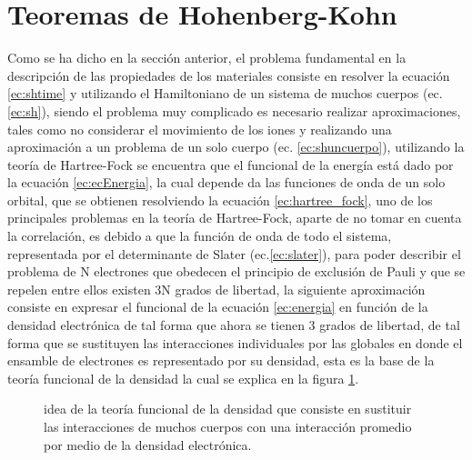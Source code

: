 \documentclass[12pt,a4paper, oneside]{book}
\begin{document}
  \section{Teoremas de Hohenberg-Kohn} \label{sec:Ho-Ko}
  Como se ha dicho en la secci\'on anterior, el problema fundamental en la descripci\'on de  las propiedades de los materiales consiste en resolver la ecuaci\'on \ref{ec:shtime} y utilizando el Hamiltoniano de un sistema de muchos cuerpos (ec. \ref{ec:sh}), siendo el problema muy complicado es necesario realizar aproximaciones, tales como no considerar el movimiento de los iones y realizando una aproximaci\'on a un problema de un solo cuerpo (ec. \ref{ec:shuncuerpo}), utilizando la teor\'ia de Hartree-Fock se encuentra que el funcional de la energ\'ia est\'a dado por la ecuaci\'on \ref{ec:ecEnergia}, la cual depende da las funciones de onda de un solo orbital, que se obtienen resolviendo la ecuaci\'on \ref{ec:hartree_fock}, uno de los principales problemas en la teor\'ia de Hartree-Fock, aparte de no tomar en cuenta la correlaci\'on, es debido a que la funci\'on de onda de todo el sistema, representada por el determinante de Slater (ec.\ref{ec:slater}), para poder describir el problema de N electrones que obedecen el principio de exclusi\'on de Pauli y que se repelen entre ellos existen 3N grados de libertad, la siguiente aproximaci\'on consiste en expresar el funcional de la ecuaci\'on \ref{ec:energia} en funci\'on de la densidad electr\'onica de tal forma que ahora se tienen 3 grados de libertad, de tal forma que se sustituyen las interacciones individuales por las globales en donde el ensamble de electrones es representado por su densidad, esta es la base de la teor\'ia funcional de la densidad la cual se explica en la figura \ref{im:dftIdea}.
  \begin{figure}[!hbt]
  	\centering
  	\caption{idea de la teor\'ia funcional de la densidad que consiste en sustituir las interacciones de muchos cuerpos con una interacci\'on promedio por medio de la densidad electr\'onica.}
  	\label{im:dftIdea}
  \end{figure}
  
\end{document}
